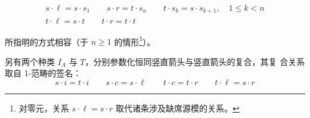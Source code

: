 \begin{equation*}
\begin{gathered}
s\cdot\ell = s\cdot s_{1} \qquad s\cdot r = t\cdot s_{n} \qquad t\cdot s_{k} = s\cdot s_{k+1},\quad 1\le k<n\\
t\cdot\ell = s\cdot t \qquad t\cdot r = t\cdot t
\end{gathered}
\end{equation*}

所指明的方式相容（于 $n\ge1$ 的情形\footnote{对零元\trCell，关系
$s\cdot\ell=s\cdot r$ 取代诸条涉及缺席源模的关系。}）。

另有两个种类 $I_{A}$ 与 $T$，分别参数化恒同竖直箭头与竖直箭头的复合，其复
合关系取自 1-范畴的签名：
\begin{equation*}
s\cdot i = t\cdot i \qquad s\cdot c = s\cdot\ell \qquad t\cdot c = t\cdot r \qquad t\cdot\ell = s\cdot r
\end{equation*}

